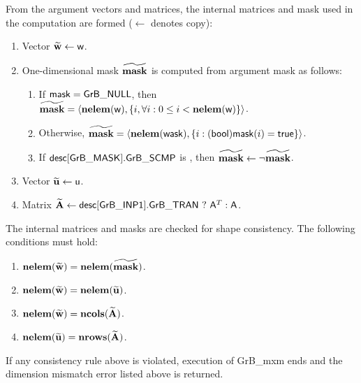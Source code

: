 From the argument vectors and matrices, the internal matrices and mask used in 
the computation are formed ($\leftarrow$ denotes copy):
\begin{enumerate}
	\item Vector ${\bf \widetilde{w}} \leftarrow {\sf w}$.

	\item One-dimensional mask ${\bf \widetilde{mask}}$ is computed from 
    argument {\sf mask} as follows:
	\begin{enumerate}
		\item	If ${\sf mask} = {\sf GrB\_NULL}$, then ${\bf \widetilde{mask}} = 
        \langle \bold{nelem}({\sf w}), \{i, \forall i : 0 \leq i < 
        \bold{nelem}({\sf w}) \} \rangle$.

		\item	Otherwise, ${\bf \widetilde{mask}} = 
        \langle \bold{nelem}({\sf wask}), \{i : ({\sf bool}){\sf mask}(i) = 
        {\sf true}\} \rangle$.

		\item	If ${\sf desc[GrB\_MASK].GrB\_SCMP}$ is \true, then ${\bf \widetilde{mask}} \leftarrow \neg {\bf \widetilde{mask}}$.
	\end{enumerate}

	\item Vector ${\bf \widetilde{u}} \leftarrow {\sf u}$.

	\item Matrix ${\bf \widetilde{A}} \leftarrow {\sf desc[GrB\_INP1].GrB\_TRAN} \ ? \ {\sf A}^T : {\sf A}$.
\end{enumerate}

The internal matrices and masks are checked for shape consistency. The following 
conditions must hold:
\begin{enumerate}
	\item $\bold{nelem}({\bf \widetilde{w}}) = \bold{nelem}({\bf \widetilde{mask}})$.

	\item $\bold{nelem}({\bf \widetilde{w}}) = \bold{nelem}({\bf \widetilde{u}})$.

	\item $\bold{nelem}({\bf \widetilde{w}}) = \bold{ncols}({\bf \widetilde{A}})$.

	\item $\bold{nelem}({\bf \widetilde{u}}) = \bold{nrows}({\bf \widetilde{A}})$.
\end{enumerate}
If any consistency rule above is violated, execution of {\sf GrB\_mxm} ends and 
the dimension mismatch error listed above is returned.

